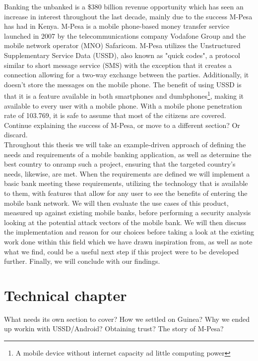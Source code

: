 \documentclass[11pt, a4paper]{article}
\begin{document}
Banking the unbanked is a \$380 billion revenue opportunity\cite{accenture} which has seen an increase in interest throughout the last decade, mainly due to the success M-Pesa has had in Kenya. M-Pesa is a mobile phone-based money transfer service launched in 2007 by the telecommunications company Vodafone Group and the mobile network operator (MNO) Safaricom. M-Pesa utilizes the Unstructured Supplementary Service Data (USSD), also known as "quick codes", a protocol similar to short message service (SMS) with the exception that it creates a connection allowing for a two-way exchange between the parties. Additionally, it doesn't store the messages on the mobile phone. The benefit of using USSD is that it is a feature available in both smartphones and dumbphones\footnote{A mobile device without internet capacity ad little computing power}, making it available to every user with a mobile phone. With a mobile phone penetration rate of 103.769\cite{wbinternet}, it is safe to assume that most of the citizens are covered. {\color{red} Continue explaining the success of M-Pesa, or move to a different section? Or discard.}\\


Throughout this thesis we will take an example-driven approach of defining the needs and requirements of a mobile banking application, as well as determine the best country to onramp such a project, ensuring that the targeted country's needs, likewise, are met. When the requirements are defined we will implement a basic bank meeting these requirements, utilizing the technology that is available to them, with features that allow for any user to see the benefits of entering the mobile bank network. We will then evaluate the use cases of this product, measured up against existing mobile banks, before performing a security analysis looking at the potential attack vectors of the mobile bank. We will then discuss the implementation and reason for our choices before taking a look at the existing work done within this field which we have drawn inspiration from, as well as note what we find, could be a useful next step if this project were to be developed further. Finally, we will conclude with our findings.







\section{Technical chapter}
What needs its own section to cover? How we settled on Guinea? Why we ended up workin with USSD/Android? Obtaining trust? The story of M-Pesa?
\end{document}
